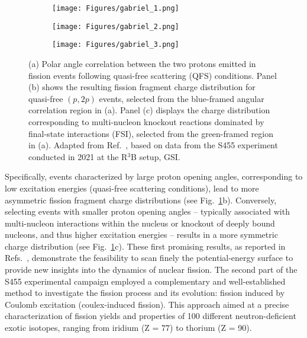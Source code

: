 \begin{figure}[htpb]
    \centering
    \begin{subfigure}[b]{0.32\textwidth}
    \texttt{[image: Figures/gabriel\_1.png]}
    \end{subfigure}
    \begin{subfigure}[b]{0.32\textwidth}
    \texttt{[image: Figures/gabriel\_2.png]}
    \end{subfigure}
    \begin{subfigure}[b]{0.32\textwidth}
    \texttt{[image: Figures/gabriel\_3.png]}
    \end{subfigure}
    \caption{
	(a) Polar angle correlation between the two protons emitted in fission events following quasi-free scattering (QFS) conditions. 
Panel (b) shows the resulting fission fragment charge distribution for quasi-free \((p,2p)\) events, selected from the blue-framed angular correlation region in (a). 
Panel (c) displays the charge distribution corresponding to multi-nucleon knockout reactions dominated by final-state interactions (FSI), selected from the green-framed region in (a). 
Adapted from Ref.~\cite{garcia2023study}, based on data from the S455 experiment conducted in 2021 at the R$^3$B setup, GSI.
	}
    \label{fig:qfs_fission}
\end{figure}
Specifically, events characterized by large proton opening angles, corresponding to low excitation energies (quasi-free scattering conditions), lead to more asymmetric fission fragment charge distributions (see Fig.~\ref{fig:qfs_fission}b). Conversely, selecting events with smaller proton opening angles -- typically associated with multi-nucleon interactions within the nucleus or knockout of deeply bound nucleons, and thus higher excitation energies -- results in a more symmetric charge distribution (see Fig.~\ref{fig:qfs_fission}c).\newline
These first promising results, as reported in Refs.~\cite{garcia2023study,grana2023fission}, demonstrate the feasibility to scan finely the potential-energy surface to provide new insights into the dynamics of nuclear fission.
\newpage
The second part of the S455 experimental campaign employed a complementary and well-established method to investigate the fission process and its evolution: fission induced by Coulomb excitation (coulex-induced fission). This approach aimed at a precise characterization of fission yields and properties of 100 different neutron-deficient exotic isotopes, ranging from iridium (Z = 77) to thorium (Z = 90).\newline
